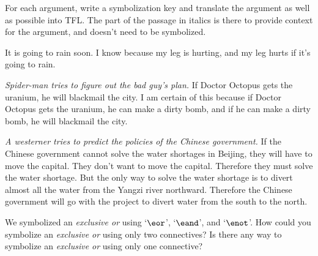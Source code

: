 \problempart
For each argument, write a symbolization key and translate the argument as well as possible into TFL. The part of the passage in italics is there to provide context for the argument, and doesn't need to be symbolized.
\begin{compactlist}
\item It is going to rain soon. I know because my leg is hurting, and my leg hurts if it's going to rain.

\item  \emph{Spider-man tries to figure out the bad guy's plan.} If Doctor Octopus gets the uranium, he will blackmail the city. I am certain of this because if Doctor Octopus gets the uranium, he can make a dirty bomb, and if he can make a dirty bomb, he will blackmail the city.

\item \emph{A westerner tries to predict the policies of the Chinese government.} If the Chinese government cannot solve the water shortages in Beijing, they will have to move the capital. They don't want to move the capital. Therefore they must solve the water shortage. But the only way to solve the water shortage is to divert almost all the water from the Yangzi river northward. Therefore the Chinese government will go with the project to divert water from the south to the north.       

\end{compactlist}

\problempart
We symbolized an \emph{exclusive or} using `$\eor$', `$\eand$', and `$\enot$'. How could you symbolize an \emph{exclusive or} using only two connectives? Is there any way to symbolize an \emph{exclusive or} using only one connective?
\\

